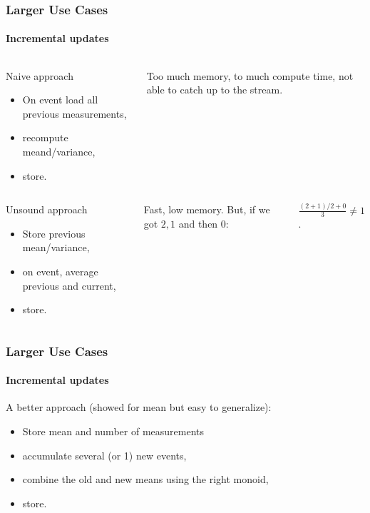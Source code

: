 \documentclass{beamer}
\begin{document}
\begin{frame}
  \frametitle{Larger Use Cases}
  \framesubtitle{Incremental updates}
  \begin{columns}[c]
      \begin{block}{Naive approach}
        \begin{itemize}
        \item On event load all previous measurements,
        \item recompute meand/variance,
        \item store.
        \end{itemize}
      \end{block}

  Too much \alert{memory}, to much compute \alert{time}, not able to \alert{catch up}
  to the stream.
  \end{columns}

  \pause

  \begin{columns}[c]
      \begin{block}{Unsound approach}
        \begin{itemize}
        \item Store previous mean/variance,
        \item on event, average previous and current,
        \item store.
        \end{itemize}
      \end{block}

    Fast, low memory. But, if we got \(2,1\) and then \(0\):

    \alert{\(\frac{(2 + 1) / 2 + 0}{3} \neq 1\).}
  \end{columns}
\end{frame}

\begin{frame}
  \frametitle{Larger Use Cases}
  \framesubtitle{Incremental updates}
  A better approach (showed for mean but easy to generalize):

  \begin{itemize}
  \item Store mean and number of measurements
  \item accumulate several (or 1) new events,
  \item combine the old and new means using the right \alert{monoid},
  \item store.
  \end{itemize}

\end{frame}
\end{document}
